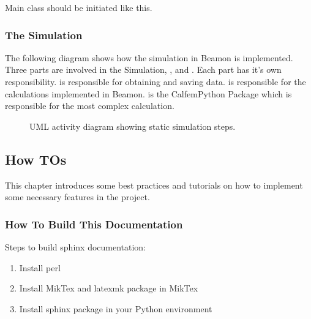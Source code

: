 \documentclass[letterpaper,10pt,english]{sphinxmanual}
\begin{document}
Main class should be initiated like this.

\begin{sphinxVerbatim}[commandchars=\\\{\}]
 
          
\end{sphinxVerbatim}


\subsubsection{The Simulation}
\label{\detokenize{implementation:the-simulation}}
The following diagram shows how the simulation in Beamon is implemented. Three parts are involved in the Simulation,
,  and . Each part has it’s own responsibility.  is responsible for obtaining and
saving data.  is responsible for the calculations implemented in Beamon.  is the Calfem\sphinxhyphen{}Python Package
which is responsible for the most complex calculation.

\begin{figure}[htbp]
\centering
\capstart

\noindent{}
\caption{UML activity diagram showing static simulation steps.}\label{\detokenize{implementation:id5}}\end{figure}


\subsection{How TOs}
\label{\detokenize{howto:how-tos}}\label{\detokenize{howto::doc}}
This chapter introduces some best practices and tutorials on how to implement some necessary features in the project.


\subsubsection{How To Build This Documentation}
\label{\detokenize{howto:how-to-build-this-documentation}}
Steps to build sphinx documentation:
\begin{enumerate}
%
\item {} 
Install perl

\item {} 
Install MikTex and latexmk package in MikTex

\item {} 
Install sphinx package in your Python environment

\end{enumerate}
\end{document}
